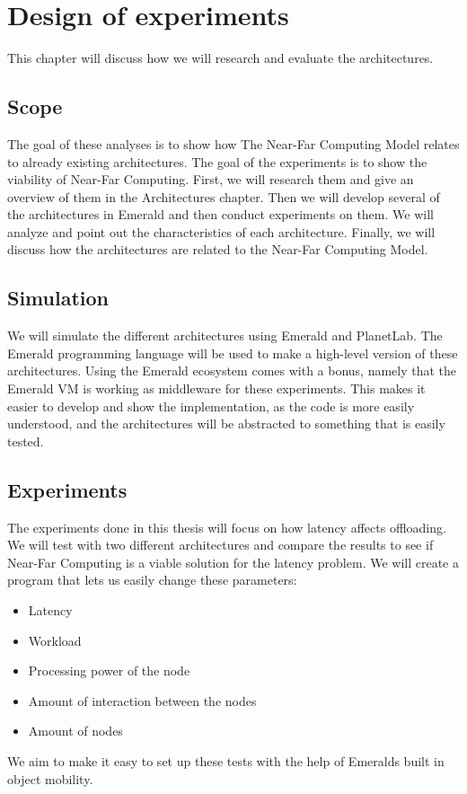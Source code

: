 \chapter{Design of experiments}\label{chapter:design_of_experiments}

This chapter will discuss how we will research and evaluate the architectures.


\section{Scope}
The goal of these analyses is to show how The Near-Far Computing Model relates to already existing architectures. The goal of the experiments is to show the viability of Near-Far Computing. First, we will research them and give an overview of them in the Architectures chapter. Then we will develop several of the architectures in Emerald and then conduct experiments on them. We will analyze and point out the characteristics of each architecture. Finally, we will discuss how the architectures are related to the Near-Far Computing Model.




\section{Simulation}
We will simulate the different architectures using Emerald and PlanetLab. The Emerald programming language will be used to make a high-level version of these architectures. Using the Emerald ecosystem comes with a bonus, namely that the Emerald VM is working as middleware for these experiments. This makes it easier to develop and show the implementation, as the code is more easily understood, and the architectures will be abstracted to something that is easily tested.








\section{Experiments}
The experiments done in this thesis will focus on how latency affects offloading. We will test with two different architectures and compare the results to see if Near-Far Computing is a viable solution for the latency problem. We will create a program that lets us easily change these parameters:
\begin{itemize}
    \item Latency
    \item Workload
    \item Processing power of the node
    \item Amount of interaction between the nodes
    \item Amount of nodes
\end{itemize}
We aim to make it easy to set up these tests with the help of Emeralds built in object mobility. 

